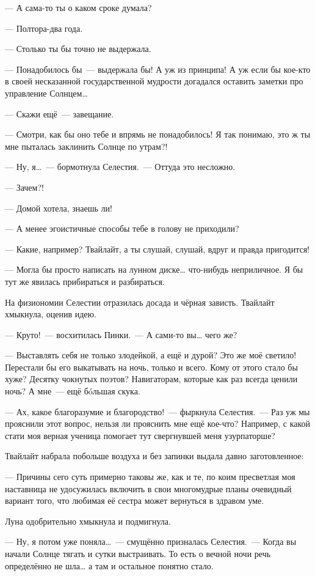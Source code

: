 \documentclass[twoside,a5paper,12pt]{extbook}
\begin{document}
— А сама-то ты о каком сроке думала?

— Полтора-два года.

— Столько ты бы точно не выдержала.

— Понадобилось бы — выдержала бы! А уж из принципа! А уж если бы кое-кто в своей несказанной государственной мудрости догадался оставить заметки про управление Солнцем…

— Скажи ещё — завещание.

— Смотри, как бы оно тебе и впрямь не понадобилось! Я так понимаю, это ж ты мне пыталась заклинить Солнце по утрам?!

— Ну, я… — бормотнула Селестия. — Оттуда это несложно.

— Зачем?!

— Домой хотела, знаешь ли!

— А менее эгоистичные способы тебе в голову не приходили?

— Какие, например? Твайлайт, а ты слушай, слушай, вдруг и правда пригодится!

— Могла бы просто написать на лунном диске… что-нибудь неприличное. Я бы тут же явилась прибираться и разбираться.

На физиономии Селестии отразилась досада и чёрная зависть. Твайлайт хмыкнула, оценив идею.

— Круто! — восхитилась Пинки. — А сами-то вы… чего же?

— Выставлять себя не только злодейкой, а ещё и дурой? Это же моё светило! Перестали бы его выкатывать на ночь, только и всего. Кому от этого стало бы хуже? Десятку чокнутых поэтов? Навигаторам, которые как раз всегда ценили ночь? А мне — ещё бóльшая скука.

— Ах, какое благоразумие и благородство! — фыркнула Селестия. — Раз уж мы прояснили этот вопрос, нельзя ли прояснить мне ещё кое-что? Например, с какой стати моя верная ученица помогает тут свергнувшей меня узурпаторше?

Твайлайт набрала побольше воздуха и без запинки выдала давно заготовленное:

— Причины сего суть примерно таковы же, как и те, по коим пресветлая моя наставница не удосужилась включить в свои многомудрые планы очевидный вариант того, что любимая её сестра может вернуться в здравом уме.

Луна одобрительно хмыкнула и подмигнула.

— Ну, я потом уже поняла… — смущённо призналась Селестия. — Когда вы начали Солнце тягать и сутки выстраивать. То есть о вечной ночи речь определённо не шла… а там и остальное понятно стало.
\end{document}

